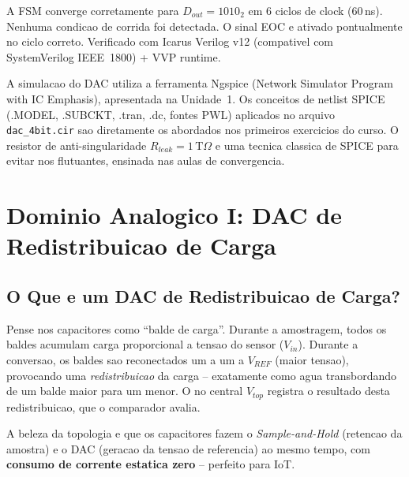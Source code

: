\documentclass[12pt, a4paper]{article}
\begin{document}
\begin{resultadobox}
A FSM converge corretamente para $D_{out} = 1010_2$ em 6 ciclos de clock (60\,ns).
Nenhuma condicao de corrida foi detectada. O sinal EOC e ativado pontualmente no ciclo
correto. Verificado com Icarus Verilog v12 (compativel com SystemVerilog IEEE~1800) + VVP runtime.
\end{resultadobox}

\begin{unidadebox}
A simulacao do DAC utiliza a ferramenta Ngspice (Network Simulator Program with IC Emphasis),
apresentada na Unidade~1. Os conceitos de netlist SPICE (.MODEL, .SUBCKT, .tran, .dc, fontes
PWL) aplicados no arquivo \texttt{dac\_4bit.cir} sao diretamente os abordados nos primeiros
exercicios do curso. O resistor de anti-singularidade $R_{leak}=1\,\text{T}\Omega$ e uma
tecnica classica de SPICE para evitar nos flutuantes, ensinada nas aulas de convergencia.
\end{unidadebox}

\section{Dominio Analogico I: DAC de Redistribuicao de Carga}

\subsection{O Que e um DAC de Redistribuicao de Carga?}

\begin{conceitobox}
Pense nos capacitores como ``balde de carga''. Durante a amostragem, todos os baldes
acumulam carga proporcional a tensao do sensor ($V_{in}$). Durante a conversao, os baldes
sao reconectados um a um a $V_{REF}$ (maior tensao), provocando uma \textit{redistribuicao}
da carga -- exatamente como agua transbordando de um balde maior para um menor. O no central
$V_{top}$ registra o resultado desta redistribuicao, que o comparador avalia.

A beleza da topologia e que os capacitores fazem o \textit{Sample-and-Hold} (retencao da
amostra) e o DAC (geracao da tensao de referencia) ao mesmo tempo, com \textbf{consumo de
corrente estatica zero} -- perfeito para IoT.
\end{conceitobox}
\end{document}
